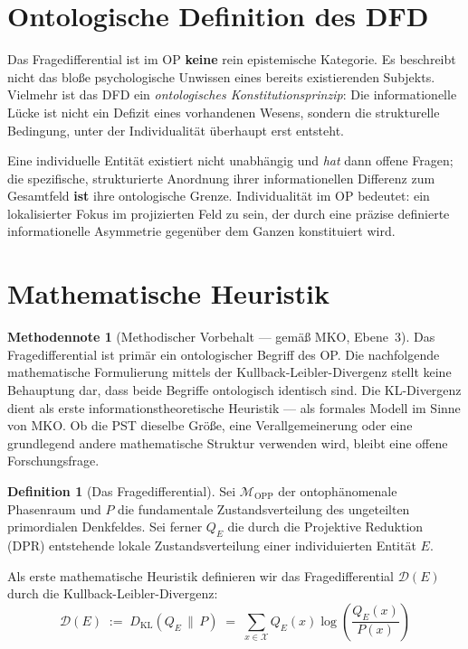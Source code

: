 \documentclass[11pt,a4paper]{article}
\theoremstyle{plain}
\theoremstyle{definition}
\newtheorem{definition}{Definition}[section]
\newtheorem{methodennote}{Methodennote}[section]
\begin{document}
\section{Ontologische Definition des DFD}

Das Fragedifferential ist im OP \textbf{keine} rein epistemische Kategorie. Es beschreibt
nicht das blo\ss{}e psychologische Unwissen eines bereits existierenden Subjekts. Vielmehr
ist das DFD ein \emph{ontologisches Konstitutionsprinzip}: Die informationelle L\"{u}cke
ist nicht ein Defizit eines vorhandenen Wesens, sondern die strukturelle Bedingung, unter
der Individualit\"{a}t \"{u}berhaupt erst entsteht.

Eine individuelle Entit\"{a}t existiert nicht unabh\"{a}ngig und \emph{hat} dann offene
Fragen; die spezifische, strukturierte Anordnung ihrer informationellen Differenz zum
Gesamtfeld \textbf{ist} ihre ontologische Grenze. Individualit\"{a}t im OP bedeutet:
ein lokalisierter Fokus im projizierten Feld zu sein, der durch eine pr\"{a}zise
definierte informationelle Asymmetrie gegen\"{u}ber dem Ganzen konstituiert wird.

\section{Mathematische Heuristik}

\begin{methodennote}[Methodischer Vorbehalt --- gem\"{a}\ss{} MKO, Ebene~3]
Das Fragedifferential ist prim\"{a}r ein ontologischer Begriff des OP. Die nachfolgende
mathematische Formulierung mittels der Kullback-Leibler-Divergenz stellt keine Behauptung
dar, dass beide Begriffe ontologisch identisch sind. Die KL-Divergenz dient als erste
informationstheoretische Heuristik --- als formales Modell im Sinne von MKO. Ob die
PST dieselbe Gr\"{o}\ss{}e, eine Verallgemeinerung oder eine grundlegend andere
mathematische Struktur verwenden wird, bleibt eine offene Forschungsfrage.
\end{methodennote}

\begin{definition}[Das Fragedifferential]
Sei $\mathcal{M}_{\mathrm{OPP}}$ der ontoph\"{a}nomenale Phasenraum und $P$ die
fundamentale Zustandsverteilung des ungeteilten primordialen Denkfeldes. Sei ferner
$Q_E$ die durch die Projektive Reduktion (DPR) entstehende lokale Zustandsverteilung
einer individuierten Entit\"{a}t $E$.

Als erste mathematische Heuristik definieren wir das Fragedifferential $\mathcal{D}(E)$
durch die Kullback-Leibler-Divergenz:
\[
  \mathcal{D}(E) \;:=\; D_{\mathrm{KL}}(Q_E \,\|\, P)
  \;=\; \sum_{x \in \mathcal{X}} Q_E(x) \log \left( \frac{Q_E(x)}{P(x)} \right)
\]
\end{definition}
\end{document}
